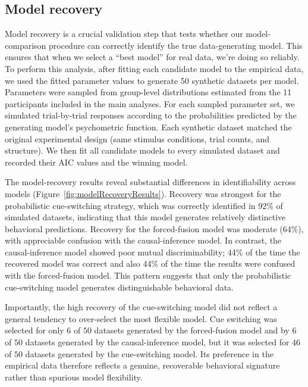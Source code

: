 \documentclass{jov}
\begin{document}
\subsection{Model recovery}

Model recovery is a crucial validation step that tests whether our model-comparison procedure can correctly identify the true data-generating model. This ensures that when we select a ``best model'' for real data, we're doing so reliably. 
To perform this analysis, after fitting each candidate model to the empirical data, we used the fitted parameter values to generate 50 synthetic datasets per model. Parameters were sampled from group-level distributions estimated from the 11 participants included in the main analyses. For each sampled parameter set, we simulated trial-by-trial responses according to the probabilities predicted by the generating model’s psychometric function. Each synthetic dataset matched the original experimental design (same stimulus conditions, trial counts, and structure). We then fit all candidate models to every simulated dataset and recorded their AIC values and the winning model.

The model-recovery results reveal substantial differences in identifiability across models (Figure~\ref{fig:modelRecoveryResults}). Recovery was strongest for the probabilistic cue-switching strategy, which was correctly identified in 92\% of simulated datasets, indicating that this model generates relatively distinctive behavioral predictions. Recovery for the forced-fusion model was moderate (64\%), with appreciable confusion with the causal-inference model. In contrast, the causal-inference model showed poor mutual discriminability; 44\% of the time the recovered model was correct and also 44\% of the time the results were confused with the forced-fusion model. This pattern suggests that only the probabilistic cue-switching model generates distinguishable behavioral data.


Importantly, the high recovery of the cue-switching model did not reflect a general tendency to over-select the most flexible model. Cue switching was selected for only $6$ of $50$ datasets generated by the forced-fusion model and by $6$ of $50$ datasets generated by the causal-inference model, but it was selected for $46$ of $50$ datasets generated by the cue-switching model. Its preference in the empirical data therefore reflects a genuine, recoverable behavioral signature rather than spurious model flexibility.
\end{document}
